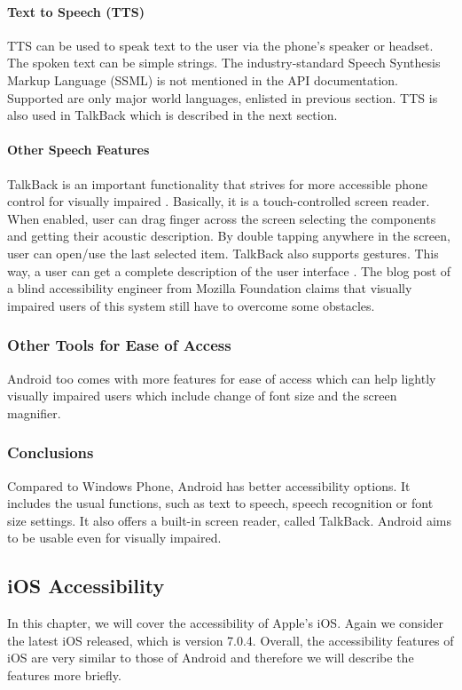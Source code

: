 \paragraph{Text to Speech (TTS)}
TTS can be used to speak text to the user via the phone's speaker or headset. The spoken text can be simple strings. The industry-standard Speech Synthesis Markup Language (SSML) is not mentioned in the API documentation. Supported are only major world languages, enlisted in previous section. TTS is also used in TalkBack which is described in the next section.

\paragraph{Other Speech Features}
TalkBack is an important functionality that strives for more accessible phone control for visually impaired \cite{androidAccbility}. Basically, it is a touch-controlled screen reader. When enabled, user can drag finger across the screen selecting the components and getting their acoustic description. By double tapping anywhere in the screen, user can open/use the last selected item. TalkBack also supports gestures. This way, a user can get a complete description of the user interface \cite{androidAccbility}. The blog post of a blind accessibility engineer from Mozilla Foundation \cite{mozillaguy} claims that visually impaired users of this system still have to overcome some obstacles.

\subsubsection{Other Tools for Ease of Access}
Android too comes with more features for ease of access which can help lightly visually impaired users which include change of font size and the screen magnifier.

\subsubsection{Conclusions}
Compared to Windows Phone, Android has better accessibility options. It includes the usual functions, such as text to speech, speech recognition or font size settings. It also offers a built-in screen reader, called TalkBack. Android aims to be usable even for visually impaired.





\subsection{iOS Accessibility}
In this chapter, we will cover the accessibility of Apple's iOS. Again we consider the latest iOS released, which is version 7.0.4. Overall, the accessibility features of iOS are very similar to those of Android and therefore we will describe the features more briefly.

